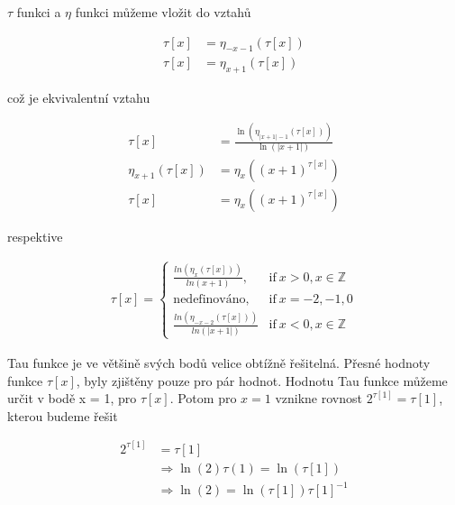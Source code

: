 \begin{theorem}
      \(\tau\) funkci a \(\eta\) funkci můžeme vložit do vztahů
      
      \begin{equation}
            \begin{aligned}
                  \tau[x] &= \eta_{-x-1}(\tau[x])\\
                  \tau[x] &=\eta_{x+1}(\tau[x])
            \end{aligned}
      \end{equation}

      což je ekvivalentní vztahu
      
      \begin{equation}
            \begin{aligned}
                  \tau[x] &= \frac{\ln(\eta_{|x+1|-1}(\tau[x]))}{\ln(|x+1|)} \\
                  \eta_{x+1}(\tau[x]) &=\eta_{x}((x+1)^{\tau[x]}) \\
                  \tau[x] &= \eta_x((x+1)^{\tau[x]})
            \end{aligned}
      \end{equation}
      
      respektive
      
      \begin{align}
            \tau[x] =\left\{ 
            \begin{array}{ll}
                  \frac{ln(\eta_{x}(\tau[x]))}{ln(x+1)}, 
                  &\mbox{if} \  x > 0, x \in \mathbb{Z} \\
                  \mbox{nedefinováno}, & \mbox{if} \ x={-2, -1, 0} \\
                  \frac{ln(\eta_{-x-2}(\tau[x]))}{ln(|x+1|)}
                  & \mbox{if} \ x < 0, x \in \mathbb{Z} 
            \end{array} 
            \right.
      \end{align}
\end{theorem}

Tau funkce je ve většině svých bodů velice obtížně řešitelná.
Přesné hodnoty funkce \(\tau[x]\), byly zjištěny pouze pro pár
hodnot. Hodnotu Tau funkce můžeme určit v bodě x = 1, pro \(\tau[x]\).
Potom pro \(x = 1\) vznikne rovnost \(2^{\tau[1]}=\tau[1]\), kterou budeme řešit

\begin{equation}
      \begin{aligned}
            2^{\tau[1]}&=\tau[1] \\
            &\Longrightarrow \ln(2)\tau(1)=\ln(\tau[1]) \\
            &\Longrightarrow \ln(2)=\ln(\tau[1])\tau[1]^{-1} 
      \end{aligned}
      \label{3}
\end{equation}

